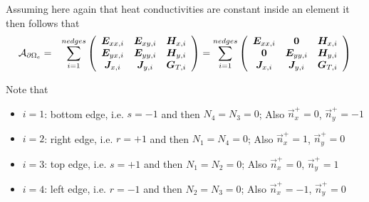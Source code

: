 Assuming here again that heat conductivities are constant inside an element
it then follows that 
\begin{eqnarray}
 {\cal A}_{\partial\Omega_e}
&=&
\sum_{i=1}^{nedges}
\left(
\begin{array}{ccc}
{\bm E}_{xx,i} & {\bm E}_{xy,i} & {\bm H}_{x,i} \\
{\bm E}_{yx,i} & {\bm E}_{yy,i} & {\bm H}_{y,i} \\
{\bm J}_{x,i} & {\bm J}_{y,i} & {\bm G}_{T,i}
\end{array}
\right)
=
\sum_{i=1}^{nedges}
\left(
\begin{array}{ccc}
{\bm E}_{xx,i} & {\bm 0} & {\bm H}_{x,i} \\
{\bm 0} & {\bm E}_{yy,i} & {\bm H}_{y,i} \\
{\bm J}_{x,i} & {\bm J}_{y,i} & {\bm G}_{T,i}
\end{array}
\right)
\end{eqnarray}



Note that 
\begin{itemize}
\item $i=1$: bottom edge, i.e. $s=-1$ and then $N_4=N_3=0$; Also $\vec{n}_x^+=0$, $\vec{n}_y^+=-1$
\item $i=2$: right  edge, i.e.  $r=+1$ and then $N_1=N_4=0$; Also $\vec{n}_x^+=1$, $\vec{n}_y^+=0$
\item $i=3$: top edge, i.e. $s=+1$  and then $N_1=N_2=0$; Also $\vec{n}_x^+=0$, $\vec{n}_y^+=1$
\item $i=4$: left edge, i.e. $r=-1$ and then $N_2=N_3=0$; Also $\vec{n}_x^+=-1$, $\vec{n}_y^+=0$
\end{itemize}

